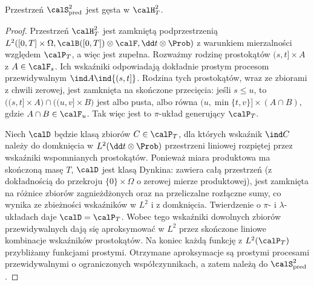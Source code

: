 \begin{lemat}
\label{lem:pred-dense}
Przestrzeń $\calS_{\mathrm{pred}}^2$ jest gęsta w
$\calH_T^2$.
\end{lemat}
\begin{proof}
Przestrzeń $\calH_T^2$ jest zamkniętą podprzestrzenią
$L^2([0,T]\times\Omega,\calB([0,T])\otimes\calF,
\dd t\otimes\Prob)$ z warunkiem mierzalności względem
$\calP_T$, a więc jest zupełna.
Rozważmy rodzinę prostokątów $(s,t]\times A$ z
$A\in\calF_s$. Ich wskaźniki odpowiadają dokładnie
prostym procesom przewidywalnym
$\ind A\ind{(s,t]}$. Rodzina tych prostokątów, wraz
ze zbiorami z chwili zerowej, jest zamknięta na
skończone przecięcia: jeśli $s\le u$, to
$\big((s,t]\times A\big)\cap\big((u,v]\times B\big)$
jest albo pusta, albo równa
$(u,\min\{t,v\}]\times(A\cap B)$, gdzie
$A\cap B\in\calF_u$. Tak więc jest to $\pi$-układ
generujący $\calP_T$.

Niech $\calD$ będzie klasą zbiorów $C\in\calP_T$,
dla których wskaźnik $\ind C$ należy do domknięcia
w $L^2(\dd t\otimes\Prob)$ przestrzeni liniowej
rozpiętej przez wskaźniki wspomnianych prostokątów.
Ponieważ miara produktowa ma skończoną masę $T$,
$\calD$ jest klasą Dynkina: zawiera całą przestrzeń
(z dokładnością do przekroju $\{0\}\times\Omega$ o
zerowej mierze produktowej), jest zamknięta na różnice
zbiorów zagnieżdżonych oraz na przeliczalne rozłączne
sumy, co wynika ze zbieżności wskaźników w $L^2$
i z domknięcia. Twierdzenie o $\pi$- i $\lambda$-układach
daje $\calD=\calP_T$. Wobec tego wskaźniki dowolnych
zbiorów przewidywalnych dają się aproksymować w $L^2$
przez skończone liniowe kombinacje wskaźników prostokątów.
Na koniec każdą funkcję z $L^2(\calP_T)$ przybliżamy
funkcjami prostymi. Otrzymane aproksymacje są
prostymi procesami przewidywalnymi o ograniczonych
współczynnikach, a zatem należą do
$\calS_{\mathrm{pred}}^2$.
\end{proof}

